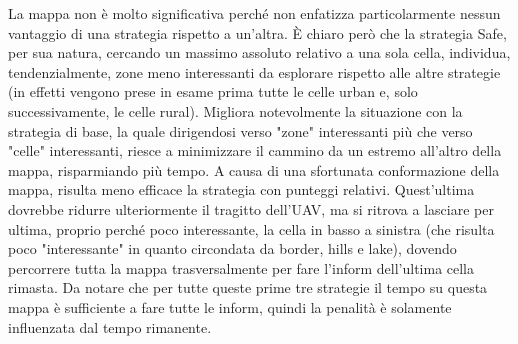 La mappa non è molto significativa perché non enfatizza particolarmente nessun vantaggio di una strategia rispetto a un'altra. È chiaro però che la strategia Safe, per sua natura, cercando un massimo assoluto relativo a una sola cella, individua, tendenzialmente, zone meno interessanti da esplorare rispetto alle altre strategie (in effetti vengono prese in esame prima tutte le celle urban e, solo successivamente, le celle rural). Migliora notevolmente la situazione con la strategia di base, la quale dirigendosi verso "zone" interessanti più che verso "celle" interessanti, riesce a minimizzare il cammino da un estremo all'altro della mappa, risparmiando più tempo.
A causa di una sfortunata conformazione della mappa, risulta meno efficace la strategia con punteggi relativi. Quest'ultima dovrebbe ridurre ulteriormente il tragitto dell'UAV, ma si ritrova a lasciare per ultima, proprio perché poco interessante, la cella in basso a sinistra (che risulta poco "interessante" in quanto circondata da border, hills e lake), dovendo percorrere tutta la mappa trasversalmente per fare l'inform dell'ultima cella rimasta. Da notare che per tutte queste prime tre strategie il tempo su questa mappa è sufficiente a fare tutte le inform, quindi la penalità è solamente influenzata dal tempo rimanente.

